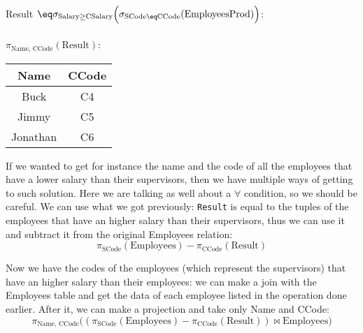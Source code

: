 \begin{center}
    Result $\eq \sigma_{\text{Salary} \geq \text{CSalary}}\Big(\sigma_{\text{SCode} \eq \text{CCode}}(\text{EmployeesProd})\Big)$:
    \\ \vspace{12pt}
    \\ \vspace{12pt}
    $\pi_{\text{Name, CCode}}(\text{Result})$: \quad \begin{tabular}{|c|c|}
        \hline \rowcolor{maindoccol!60}
        \textbf{Name} & \textbf{CCode} \\
        \hline
        Buck & C4 \\
        \hline
        Jimmy & C5 \\
        \hline
        Jonathan & C6 \\
        \hline
    \end{tabular}
\end{center}

If we wanted to get for instance the name and the code of all the employees that have a lower salary than their supervisors, then we have multiple ways of getting to such solution. Here we are talking as well about a $\forall$ condition, so we should be careful. We can use what we got previously: \texttt{Result} is equal to the tuples of the employees that have an higher salary than their supervisors, thus we can use it and subtract it from the original Employees relation:
\[ \pi_{\text{SCode}}(\text{Employees}) - \pi_{\text{CCode}}(\text{Result}) \]

Now we have the codes of the employees (which represent the supervisors) that have an higher salary than their employees: we can make a join with the Employees table and get the data of each employee listed in the operation done earlier. After it, we can make a projection and take only Name and CCode:
\[ \pi_{\text{Name, CCode}} \Big((\pi_{\text{SCode}}(\text{Employees}) - \pi_{\text{CCode}}(\text{Result})) \bowtie \text{Employees}\Big)\]

